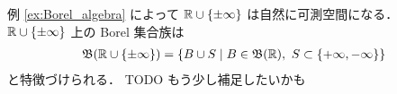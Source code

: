 \begin{example}
    例 \ref{ex:Borel_algebra} によって $\mathbb{R}\cup\{\pm\infty\}$ は自然に可測空間になる．
    $\mathbb{R}\cup\{\pm\infty\}$ 上の Borel 集合族は
    \begin{align*}
        \mathfrak{B}(\mathbb{R}\cup\{\pm\infty\})
        =\{B\cup S\mid B\in\mathfrak{B}(\mathbb{R}),\ S\subset\{+\infty,-\infty\}\}
    \end{align*}
    と特徴づけられる．
    {\color{red} TODO もう少し補足したいかも}
\end{example}
